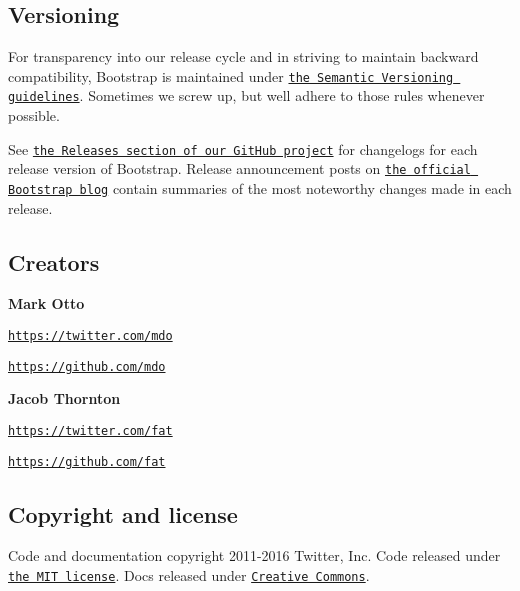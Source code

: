\subsection*{Versioning}

For transparency into our release cycle and in striving to maintain backward compatibility, Bootstrap is maintained under \href{http://semver.org/}{\tt the Semantic Versioning guidelines}. Sometimes we screw up, but we\textquotesingle{}ll adhere to those rules whenever possible.

See \href{https://github.com/twbs/bootstrap/releases}{\tt the Releases section of our Git\+Hub project} for changelogs for each release version of Bootstrap. Release announcement posts on \href{http://blog.getbootstrap.com}{\tt the official Bootstrap blog} contain summaries of the most noteworthy changes made in each release.

\subsection*{Creators}

{\bfseries Mark Otto}


\begin{DoxyItemize}
\item \href{https://twitter.com/mdo}{\tt https\+://twitter.\+com/mdo}
\item \href{https://github.com/mdo}{\tt https\+://github.\+com/mdo}
\end{DoxyItemize}

{\bfseries Jacob Thornton}


\begin{DoxyItemize}
\item \href{https://twitter.com/fat}{\tt https\+://twitter.\+com/fat}
\item \href{https://github.com/fat}{\tt https\+://github.\+com/fat}
\end{DoxyItemize}

\subsection*{Copyright and license}

Code and documentation copyright 2011-\/2016 Twitter, Inc. Code released under \href{https://github.com/twbs/bootstrap/blob/master/LICENSE}{\tt the M\+IT license}. Docs released under \href{https://github.com/twbs/bootstrap/blob/master/docs/LICENSE}{\tt Creative Commons}. 